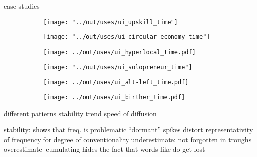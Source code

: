 \documentclass[a4paper, abstract=on]{scrartcl}
\begin{document}
    case studies

      \begin{figure}
        \caption{Temporal dynamics in usage frequency for case studies.}
        \centering
        \begin{subfigure}{.3\linewidth}
          \caption{}
          \texttt{[image: "../out/uses/ui\_upskill\_time"]}
        \end{subfigure}
        \begin{subfigure}{.3\linewidth}
          \caption{}
          \texttt{[image: "../out/uses/ui\_circular economy\_time"]}
        \end{subfigure}
        \begin{subfigure}{.3\linewidth}
          \caption{}
          \texttt{[image: ../out/uses/ui\_hyperlocal\_time.pdf]}
        \end{subfigure}

        \begin{subfigure}{.3\linewidth}
          \caption{}
          \texttt{[image: "../out/uses/ui\_solopreneur\_time"]}
        \end{subfigure}
        \begin{subfigure}{.3\linewidth}
          \caption{}
          \texttt{[image: ../out/uses/ui\_alt-left\_time.pdf]}
        \end{subfigure}
        \begin{subfigure}{.3\linewidth}
          \caption{}
          \texttt{[image: ../out/uses/ui\_birther\_time.pdf]}
        \end{subfigure}
      \end{figure}

    different patterns
      stability
      trend
      speed of diffusion

    stability: shows that freq. is problematic
      \enquote{dormant}
        spikes distort representativity of frequency for degree of conventionality
          underestimate:  not forgotten in troughs
          overestimate: cumulating hides the fact that words like  do get lost
\end{document}

